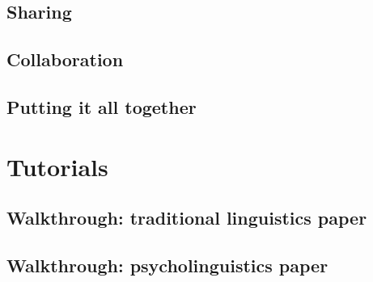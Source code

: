 \documentclass[11pt]{book}
\begin{document}
\chapter{Sharing}
\label{sec-2-6}
\chapter{Collaboration}
\label{sec-2-7}
\chapter{Putting it all together}
\label{sec-2-8}
\part{Tutorials}
\label{sec-3}
\chapter{Walkthrough: traditional linguistics paper}
\label{sec-3-1}
\chapter{Walkthrough: psycholinguistics paper}
\label{sec-3-2}


\printbibliography
\end{document}
